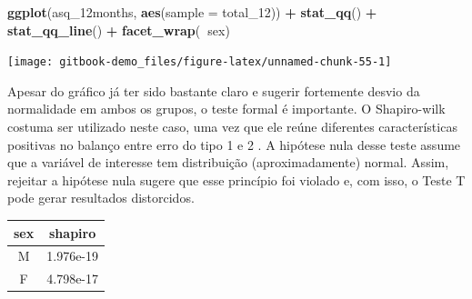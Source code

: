 \documentclass[
]{book}
\newenvironment{Shaded}{\begin{snugshade}}{\end{snugshade}}
\newcommand{\DataTypeTok}[1]{\textcolor[rgb]{0.13,0.29,0.53}{#1}}
\newcommand{\DecValTok}[1]{\textcolor[rgb]{0.00,0.00,0.81}{#1}}
\newcommand{\KeywordTok}[1]{\textcolor[rgb]{0.13,0.29,0.53}{\textbf{#1}}}
\newcommand{\NormalTok}[1]{#1}
\newcommand{\OperatorTok}[1]{\textcolor[rgb]{0.81,0.36,0.00}{\textbf{#1}}}
\newcommand{\StringTok}[1]{\textcolor[rgb]{0.31,0.60,0.02}{#1}}
\begin{document}
\begin{Shaded}
\begin{Highlighting}[]
\KeywordTok{ggplot}\NormalTok{(asq_12months, }\KeywordTok{aes}\NormalTok{(}\DataTypeTok{sample =}\NormalTok{ total_}\DecValTok{12}\NormalTok{)) }\OperatorTok{+}\StringTok{ }
\StringTok{  }\KeywordTok{stat_qq}\NormalTok{() }\OperatorTok{+}\StringTok{ }
\StringTok{  }\KeywordTok{stat_qq_line}\NormalTok{() }\OperatorTok{+}
\StringTok{  }\KeywordTok{facet_wrap}\NormalTok{(}\OperatorTok{~}\NormalTok{sex)}
\end{Highlighting}
\end{Shaded}

\begin{center}\texttt{[image: gitbook-demo\_files/figure-latex/unnamed-chunk-55-1]} \end{center}

Apesar do gráfico já ter sido bastante claro e sugerir fortemente desvio da normalidade em ambos os grupos, o teste formal é importante. O Shapiro-wilk costuma ser utilizado neste caso, uma vez que ele reúne diferentes características positivas no balanço entre erro do tipo 1 e 2 \citep{Yap2011}. A hipótese nula desse teste assume que a variável de interesse tem distribuição (aproximadamente) normal. Assim, rejeitar a hipótese nula sugere que esse princípio foi violado e, com isso, o Teste T pode gerar resultados distorcidos.

\begin{Shaded}
\end{Shaded}

\begin{longtable}[]{@{}cc@{}}
\toprule
\begin{minipage}[b]{0.08\columnwidth}\centering
sex\strut
\end{minipage} & \begin{minipage}[b]{0.16\columnwidth}\centering
shapiro\strut
\end{minipage}\tabularnewline
\midrule
\endhead
\begin{minipage}[t]{0.08\columnwidth}\centering
M\strut
\end{minipage} & \begin{minipage}[t]{0.16\columnwidth}\centering
1.976e-19\strut
\end{minipage}\tabularnewline
\begin{minipage}[t]{0.08\columnwidth}\centering
F\strut
\end{minipage} & \begin{minipage}[t]{0.16\columnwidth}\centering
4.798e-17\strut
\end{minipage}\tabularnewline
\bottomrule
\end{longtable}
\end{document}
